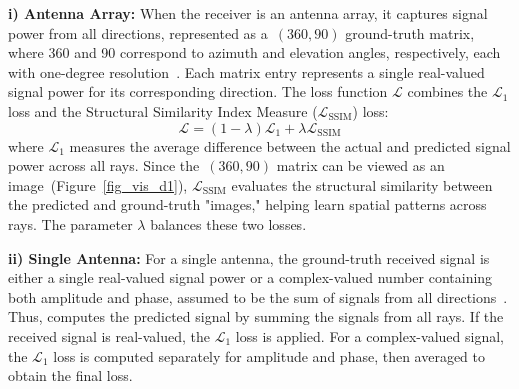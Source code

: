 \textbf{i) Antenna Array:}
When the receiver is an antenna array, it captures signal power from all directions, represented as a~\((360, 90)\) ground-truth matrix, where 360 and 90 correspond to azimuth and elevation angles, respectively, each with one-degree resolution~\cite{zhao2023nerf}.  
Each matrix entry represents a single real-valued signal power for its corresponding direction.  
The loss function \(\mathcal{L}\) combines the \(\mathcal{L}_{1}\) loss and the Structural Similarity Index Measure (\(\mathcal{L}_{\text{SSIM}}\)) loss: 
\begin{equation}
\label{eqn_loss}
\mathcal{L} = (1 - \lambda) \mathcal{L}_{1} + \lambda \mathcal{L}_{\text{SSIM}}
\end{equation}
where \(\mathcal{L}_{1}\) measures the average difference between the actual and predicted signal power across all rays.  
Since the~\((360, 90)\) matrix can be viewed as an image~(Figure~\ref{fig_vis_d1}), \(\mathcal{L}_{\text{SSIM}}\) evaluates the structural similarity between the predicted and ground-truth "images," helping \ourSystem learn spatial patterns across rays.  
The parameter \(\lambda\) balances these two losses.



\textbf{ii) Single Antenna:}  
For a single antenna, the ground-truth received signal is either a single real-valued signal power or a complex-valued number containing both amplitude and phase, assumed to be the sum of signals from all directions~\cite{zhao2023nerf}.  
Thus, \ourSystem computes the predicted signal by summing the signals from all rays.  
If the received signal is real-valued, the \(\mathcal{L}_{1}\) loss is applied.  
For a complex-valued signal, the \(\mathcal{L}_{1}\) loss is computed separately for amplitude and phase, then averaged to obtain the final loss.
 

